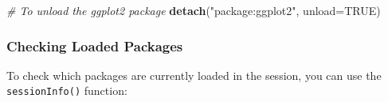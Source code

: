 \documentclass[
]{book}
\newenvironment{Shaded}{\begin{snugshade}}{\end{snugshade}}
\newcommand{\AttributeTok}[1]{\textcolor[rgb]{0.13,0.29,0.53}{#1}}
\newcommand{\CommentTok}[1]{\textcolor[rgb]{0.56,0.35,0.01}{\textit{#1}}}
\newcommand{\ConstantTok}[1]{\textcolor[rgb]{0.56,0.35,0.01}{#1}}
\newcommand{\FunctionTok}[1]{\textcolor[rgb]{0.13,0.29,0.53}{\textbf{#1}}}
\newcommand{\NormalTok}[1]{#1}
\newcommand{\StringTok}[1]{\textcolor[rgb]{0.31,0.60,0.02}{#1}}
\begin{document}
\begin{Shaded}
\begin{Highlighting}[]
\CommentTok{\# To unload the ggplot2 package}
\FunctionTok{detach}\NormalTok{(}\StringTok{"package:ggplot2"}\NormalTok{, }\AttributeTok{unload=}\ConstantTok{TRUE}\NormalTok{)}
\end{Highlighting}
\end{Shaded}

\hypertarget{checking-loaded-packages}{%
\subsubsection*{Checking Loaded Packages}\label{checking-loaded-packages}}

To check which packages are currently loaded in the session, you can use the \texttt{sessionInfo()} function:
\end{document}
